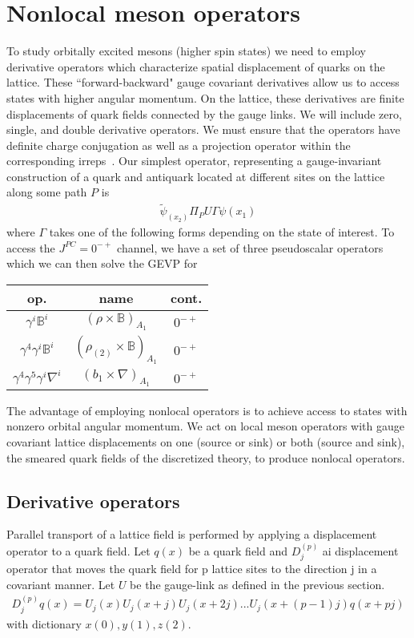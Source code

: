 \section{Nonlocal meson operators}
To study orbitally excited mesons (higher spin states) we need to employ derivative operators which characterize spatial displacement of quarks on the lattice. These ``forward-backward" gauge covariant derivatives allow us to access states with higher angular momentum. On the lattice, these derivatives are finite displacements of quark fields connected by the gauge links. We will include zero, single, and double derivative operators. We must ensure that the operators have definite charge conjugation as well as a projection operator within the corresponding irreps~\cite{liao2002excitedcharmoniumspectrumanisotropic}. Our simplest operator, representing a gauge-invariant construction of a quark and antiquark located at different sites on the lattice along some path $P$ is 
\begin{align}
    \tilde{\psi}_(x_2)\Pi_P U \Gamma \psi(x_1)
\end{align}
where $\Gamma$ takes one of the following forms depending on the state of interest. To access the $J^{PC}=0^{-+}$ channel, we have a set of three pseudoscalar operators which we can then solve the GEVP for
\begin{table}[H]
    \centering
\begin{tabular}{ccc}
    op. & name & cont. \\
    \hline
    $\gamma^i \mathbb{B}^i$ & $(\rho \times \mathbb{B})_{A_1}$ & $0^{-+}$ \\
    $\gamma^4 \gamma^i \mathbb{B}^i$ & $(\rho_{(2)} \times \mathbb{B})_{A_1}$ & $0^{-+}$ \\
    $\gamma^4 \gamma^5 \gamma^i \nabla^i$ & $(b_1 \times \nabla)_{A_1}$ & $0^{-+}$ \\
    \end{tabular}
\end{table}


The advantage of employing nonlocal operators is to achieve access to states with nonzero orbital angular momentum. We act on local meson operators with gauge covariant lattice displacements on one (source or sink) or both (source and sink), the smeared quark fields of the discretized theory, to produce nonlocal operators. 

\subsection{Derivative operators}
Parallel transport of a lattice field is performed by applying a displacement operator to a quark field.  Let $q(x)$ be a quark field and $D_j^{(p)}$ ai displacement operator that moves the quark field for p lattice sites to the direction j in a covariant manner. Let $U$ be the gauge-link as defined in the previous section.
\begin{align}
    D_j^{(p)} q(x) = U_j(x) U_j(x+j) U_j(x+2j)...U_j(x+(p-1)j) q(x+pj)
\end{align}
with dictionary $x(0), y(1), z(2)$.

